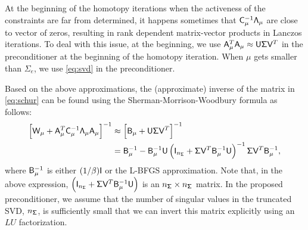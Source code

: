 
\begin{remark}
 At the beginning of the homotopy iterations when the activeness of the constraints are far from 
determined, it happens sometimes that  $ \mathsf{C}_\mu^{-1}  \mathsf{\Lambda}_{\mu}$ are close to 
vector of zeros, resulting in rank dependent matrix-vector products in Lanczos iterations. To deal 
with this issue, at the beginning, we use $  \mathsf{A}_\mu^T \mathsf{A}_\mu
  \approx \mathsf{U} \mathsf{\Sigma} \mathsf{V}^T $ in the preconditioner at the beginning of the homotopy iteration. 
  When $\mu$ gets smaller than $\Sigma_e$, we use \eqref{eq:svd} in the preconditioner. 	
\end{remark}

Based on the above approximations, the (approximate) inverse of the matrix in
\eqref{eq:schur} can be found using the Sherman-Morrison-Woodbury formula as follows:
\begin{align}
\left[\mathsf{W}_\mu + \mathsf{A}_\mu^T \mathsf{C}_\mu^{-1}  \mathsf{\Lambda}_\mu  \mathsf{A}_\mu \right]^{-1}
&\approx
\left[\mathsf{B}_{\mu} + \mathsf{U} \mathsf{\Sigma} \mathsf{V}^T \right]^{-1} \notag \\
&= \mathsf{B}_\mu^{-1} - \mathsf{B}_\mu^{-1} \mathsf{U}  \left(  \mathsf{I}_{n_{\mathsf{\Sigma}}} +  \mathsf{\Sigma} \mathsf{V}^{T} \mathsf{B}_\mu^{-1} 
\mathsf{U} \right)^{-1} \mathsf{\Sigma} \mathsf{V}^{T} \mathsf{B}_\mu^{-1},
\label{eq:smw}
\end{align}
where $\mathsf{B}_\mu^{-1}$ is either $(1/\beta)\mathsf{I}$ or the L-BFGS
approximation.  Note that, in the above expression, $\left(\mathsf{I}_{n_{\mathsf{\Sigma}}} +
\mathsf{\Sigma} \mathsf{V}^{T} \mathsf{B}_{\mu}^{-1} \mathsf{U} \right)$ is an $n_{\mathsf{\Sigma}}\times
n_{\mathsf{\Sigma}}$ matrix.  In the proposed preconditioner, we assume that the number of
singular values in the truncated SVD, \ie $n_{\mathsf{\Sigma}}$, is sufficiently small that we
can invert this matrix explicitly using an $LU$ factorization.


